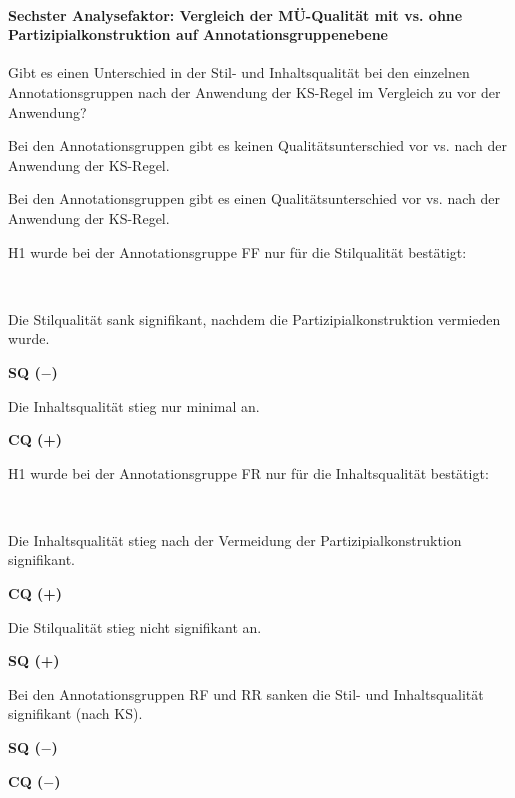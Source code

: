 \paragraph*{Sechster Analysefaktor: Vergleich der MÜ-Qualität mit vs. ohne Partizipialkonstruktion auf Annotationsgruppenebene}
\begin{description}[font=\normalfont\bfseries]
\item [Fragestellung:] Gibt es einen Unterschied in der Stil- und Inhaltsqualität bei den einzelnen Annotationsgruppen nach der Anwendung der KS-Regel im Vergleich zu vor der Anwendung?
\item [H0 --] Bei den Annotationsgruppen gibt es keinen Qualitätsunterschied vor vs. nach der Anwendung der KS-Regel.
\item [H1 --] Bei den Annotationsgruppen gibt es einen Qualitätsunterschied vor vs. nach der Anwendung der KS-Regel.
\newpage
\item [Resultat]
\end{description}
\noindent
\parbox[t]{.8\textwidth}{H1 wurde bei der Annotationsgruppe FF nur für die Stilqualität bestätigt:}\\
\parbox[t]{.8\textwidth}{Die Stilqualität sank signifikant, nachdem die Partizipialkonstruktion vermieden wurde.}
\parbox[t]{.04\textwidth}{}
\colorbox{smGreen}{\parbox[t]{.15\textwidth}{\textbf{SQ ($-$)}\\}}

\medskip
\noindent
\parbox[t]{.8\textwidth}{Die Inhaltsqualität stieg nur minimal an.}
\parbox[t]{.04\textwidth}{}
\colorbox{smGreen}{\parbox[t]{.15\textwidth}{\textbf{CQ (+)}}}

\noindent
\parbox[t]{.8\textwidth}{H1 wurde bei der Annotationsgruppe FR nur für die Inhaltsqualität bestätigt:}\\
\parbox[t]{.8\textwidth}{Die Inhaltsqualität stieg nach der Vermeidung der Partizipialkonstruktion signifikant.}
\parbox[t]{.04\textwidth}{}
\colorbox{smGreen}{\parbox[t]{.15\textwidth}{\textbf{CQ (+)}\\}}

\medskip
\noindent
\parbox[t]{.8\textwidth}{Die Stilqualität stieg nicht signifikant an.}
\parbox[t]{.04\textwidth}{}
\parbox[t]{.15\textwidth}{\textbf{SQ (+)}}

\medskip
\noindent
\parbox[t]{.8\textwidth}{Bei den Annotationsgruppen RF und RR sanken die Stil- und Inhaltsqualität signifikant (nach KS).}
\parbox[t]{.04\textwidth}{}
\colorbox{smGreen}{\parbox[t]{.15\textwidth}{
{ \textbf{SQ ($-$)}}

 \textbf{CQ ($-$)}
}}

